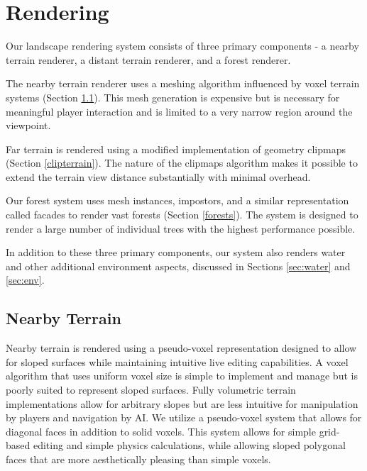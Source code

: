
\chapter{Rendering} \label{rendering}

Our landscape rendering system consists of three primary components - a nearby terrain renderer, a distant terrain renderer, and a forest renderer.

The nearby terrain renderer uses a meshing algorithm influenced by voxel terrain systems (Section \ref{voxterrain}).
This mesh generation is expensive but is necessary for meaningful player interaction and is limited to a very narrow region around the viewpoint.

Far terrain is rendered using a modified implementation of geometry clipmaps (Section \ref{clipterrain}).
The nature of the clipmaps algorithm makes it possible to extend the terrain view distance substantially with minimal overhead.

Our forest system uses mesh instances, impostors, and a similar representation called facades to render vast forests (Section \ref{forests}).
The system is designed to render a large number of individual trees with the highest performance possible.

In addition to these three primary components, our system also renders water and other additional environment aspects, discussed in Sections \ref{sec:water} and \ref{sec:env}.

\section{Nearby Terrain} \label{voxterrain} %

Nearby terrain is rendered using a pseudo-voxel representation designed to allow for sloped surfaces while maintaining intuitive live editing capabilities.
A voxel algorithm that uses uniform voxel size is simple to implement and manage but is poorly suited to represent sloped surfaces.
Fully volumetric terrain implementations allow for arbitrary slopes but are less intuitive for manipulation by players and navigation by AI.
We utilize a pseudo-voxel system that allows for diagonal faces in addition to solid voxels.
This system allows for simple grid-based editing and simple physics calculations, while allowing sloped polygonal faces that are more aesthetically pleasing than simple voxels.

